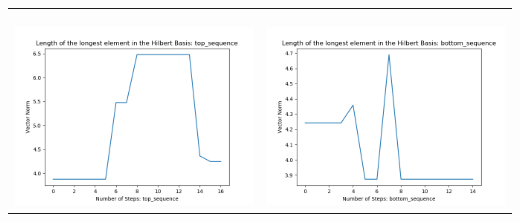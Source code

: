 \documentclass[10pt]{article}
\begin{document}
\begin{tabular}{c|c}
\begin{minipage}{.45\textwidth}
\end{minipage} \\ \\
\hline \\\begin{minipage}{.45\textwidth}
\includegraphics[width=\textwidth]{"DATA/4d/5 generators 2 bound D/top_sequence LENGTH"}
\end{minipage} &
\begin{minipage}{.45\textwidth}
\includegraphics[width=\textwidth]{"DATA/4d/5 generators 2 bound D bottomup/bottom_sequence LENGTH"}
\end{minipage}
\end{tabular}
\end{document}
